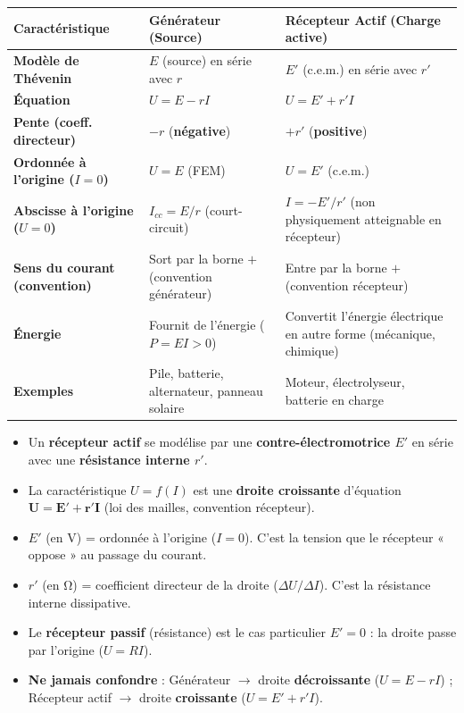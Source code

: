 \documentclass[11pt]{article}
\begin{document}
\begin{center}
\begin{tabularx}{\linewidth}{|l|X|X|}\hline
\rowcolor{popblueL}
\textbf{Caractéristique} & \textbf{Générateur (Source)} & \textbf{Récepteur Actif (Charge active)} \\ \hline
\textbf{Modèle de Thévenin} & $E$ (source) en série avec $r$ & $E'$ (c.e.m.) en série avec $r'$ \\ \hline
\textbf{Équation} & $U = E - rI$ & $U = E' + r'I$ \\ \hline
\textbf{Pente (coeff. directeur)} & $-r$ (\textbf{négative}) & $+r'$ (\textbf{positive}) \\ \hline
\textbf{Ordonnée à l'origine ($I=0$)} & $U = E$ (FEM) & $U = E'$ (c.e.m.) \\ \hline
\textbf{Abscisse à l'origine ($U=0$)} & $I_{cc} = E/r$ (court-circuit) & $I = -E'/r'$ (non physiquement atteignable en récepteur) \\ \hline
\textbf{Sens du courant (convention)} & Sort par la borne $+$ (convention générateur) & Entre par la borne $+$ (convention récepteur) \\ \hline
\textbf{Énergie} & Fournit de l'énergie ($P = EI > 0$) & Convertit l'énergie électrique en autre forme (mécanique, chimique) \\ \hline
\textbf{Exemples} & Pile, batterie, alternateur, panneau solaire & Moteur, électrolyseur, batterie en charge \\ \hline
\end{tabularx}
\end{center}

\begin{aretenir}
\begin{itemize}
\item Un \textbf{récepteur actif} se modélise par une \textbf{contre-électromotrice $E'$} en série avec une \textbf{résistance interne $r'$}.
\item La caractéristique $U = f(I)$ est une \textbf{droite croissante} d'équation $\boldsymbol{U = E' + r'I}$ (loi des mailles, convention récepteur).
\item \textbf{$E'$} (en \si{\volt}) = ordonnée à l'origine ($I=0$). C'est la tension que le récepteur « oppose » au passage du courant.
\item \textbf{$r'$} (en \si{\ohm}) = coefficient directeur de la droite ($\Delta U / \Delta I$). C'est la résistance interne dissipative.
\item Le \textbf{récepteur passif} (résistance) est le cas particulier $E' = 0$ : la droite passe par l'origine ($U = RI$).
\item \textbf{Ne jamais confondre} : Générateur $\rightarrow$ droite \textbf{décroissante} ($U = E - rI$) ; Récepteur actif $\rightarrow$ droite \textbf{croissante} ($U = E' + r'I$).
\end{itemize}
\end{aretenir}
\end{document}
